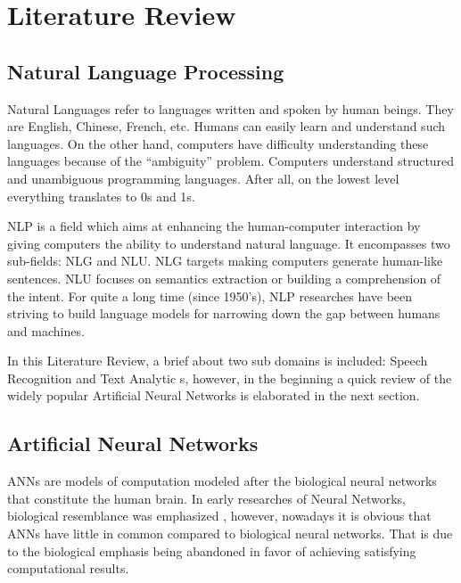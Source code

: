 \chapter{Literature Review}
\label{chap:background}

\section{Natural Language Processing} 
\label{bg:s1}


Natural Languages refer to languages written and spoken by human beings. They are English, Chinese, French, etc. Humans can easily learn and understand such languages. On the other hand, computers have difficulty understanding these languages because of the \enquote{ambiguity} problem. Computers understand structured and unambiguous programming languages. After all, on the lowest level everything translates to 0s and 1s. 

\ac{NLP} is a field which aims at enhancing the human-computer interaction by giving computers the ability to understand natural language. It encompasses two sub-fields: \ac{NLG} and \ac{NLU}. \ac{NLG} targets making computers generate human-like sentences. \ac{NLU} focuses on semantics extraction or building a comprehension of the intent. For quite a long time (since 1950's), \ac{NLP} researches have been striving to build language models for narrowing down the gap between humans and machines.


In this Literature Review, a brief about two sub domains is included: Speech Recognition and Text Analytic s, however, in the beginning a quick review of the widely popular Artificial Neural Networks is elaborated in the next section.



\section{Artificial Neural Networks} \label{bg:s2} 
\ac{ANNs} are models of computation modeled after the biological neural networks that constitute the human brain. 
In early researches of Neural Networks, biological resemblance was emphasized \cite{hopfield1982neural} \cite{jordan1986serial} \cite{elman1990finding}, however, nowadays it is obvious that \ac{ANNs} have little in common compared to biological neural networks. That is due to the biological emphasis being abandoned in favor of achieving satisfying computational results.


